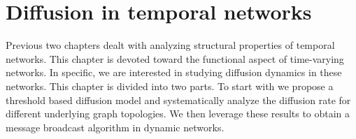 \chapter{Diffusion in temporal networks}
Previous two chapters dealt with analyzing structural properties of temporal networks. This chapter is devoted toward the functional aspect of time-varying networks.  
In specific, we are interested in studying diffusion dynamics in these networks. 
This chapter is divided into two parts. To start with we propose a threshold based diffusion model and systematically analyze the diffusion rate for different underlying 
graph topologies. We then leverage these results to obtain a message broadcast algorithm in dynamic networks. 
















